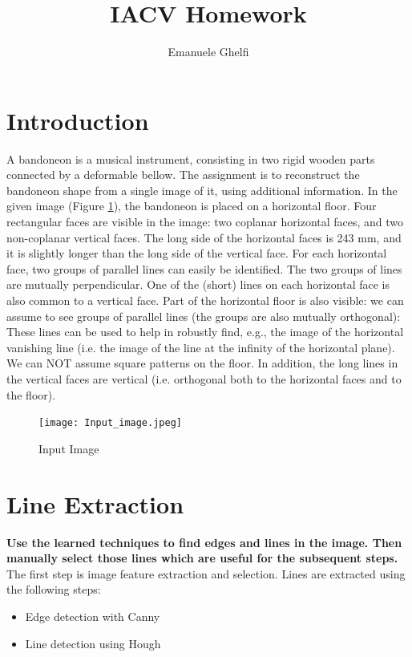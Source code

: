 \documentclass[11pt, oneside]{article}   	%
\title{IACV Homework}
\author{Emanuele Ghelfi}
\affil{Politecnico di Milano}
\begin{document}
\maketitle

\pagebreak
\tableofcontents
\pagebreak
\section{Introduction}
A bandoneon is a musical instrument, consisting in two rigid wooden parts connected by a deformable bellow. The assignment is to reconstruct the bandoneon shape from a single image of it, using additional information.
In the given image (Figure \ref{inputimg}), the bandoneon is placed on a horizontal floor. Four rectangular faces are visible in the image: two coplanar horizontal faces, and two non-coplanar vertical faces. The long side of the horizontal faces is 243 mm, and it is slightly longer than the long side of the vertical face.
For each horizontal face, two groups of parallel lines can easily be identified. The two groups of lines are mutually perpendicular. One of the (short) lines on each horizontal face is also common to a vertical face. Part of the horizontal floor is also visible: we can assume to see groups of parallel lines (the groups are also mutually orthogonal): These lines can be used to help in robustly find, e.g., the image of the horizontal vanishing line (i.e. the image of the line at the infinity of the horizontal plane). We can NOT assume square patterns on the floor.
In addition, the long lines in the vertical faces are vertical (i.e. orthogonal both to the horizontal faces and to the floor).
\begin{figure}[!b]
\texttt{[image: Input\_image.jpeg]}
\caption{Input Image}
\label{inputimg}
\end{figure}

\section{Line Extraction}
\textbf{Use the learned techniques to find edges and lines in the image. Then manually select those lines which are useful for the subsequent steps.} \hfill \break
The first step is image feature extraction and selection. 
Lines are extracted using the following steps:
\begin{itemize}
\item Edge detection with Canny
\item Line detection using Hough

\end{itemize}
\end{document}
